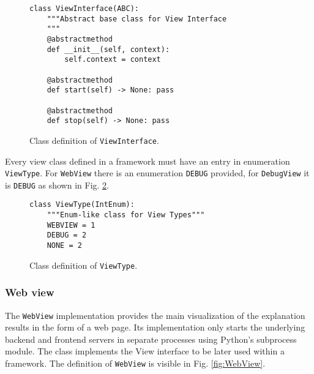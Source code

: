 \documentclass[
    bindingoffset=5mm,  %
    footnoteindent=3mm, %
    hyphenation=true    %
]{src/wut-thesis}
\begin{document}
\begin{figure}%
\begin{verbatim}
class ViewInterface(ABC):
    """Abstract base class for View Interface
    """
    @abstractmethod
    def __init__(self, context):
        self.context = context

    @abstractmethod
    def start(self) -> None: pass

    @abstractmethod
    def stop(self) -> None: pass    
\end{verbatim}
\caption{Class definition of \texttt{ViewInterface}.}
\label{fig:ViewInterface}
\end{figure}

Every view class defined in a framework must have an entry in enumeration \texttt{ViewType}.
For \texttt{WebView} there is an enumeration \texttt{DEBUG} provided, for \texttt{DebugView}
it is \texttt{DEBUG} as shown in Fig. \ref{fig:ViewType}.

\begin{figure}%
\begin{verbatim}
class ViewType(IntEnum):
    """Enum-like class for View Types"""
    WEBVIEW = 1
    DEBUG = 2
    NONE = 2
\end{verbatim}
\caption{Class definition of \texttt{ViewType}.}
\label{fig:ViewType}
\end{figure}

\subsubsection{Web view}

The \texttt{WebView} implementation provides the main visualization of the explanation results
in the form of a web page. Its implementation only starts the underlying backend and frontend servers
in separate processes using Python's subprocess module.  The class implements the View interface to be later used within a framework. The definition of \texttt{WebView} is visible in Fig. \ref{fig:WebView}.
\end{document}
